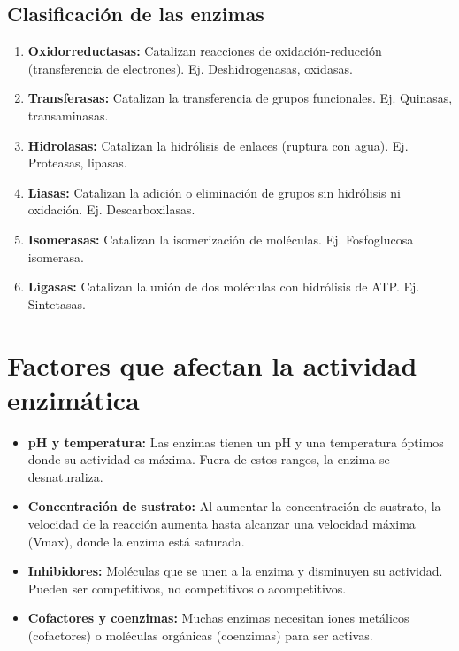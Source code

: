 \subsection{Clasificación de las enzimas}
\begin{enumerate}
    \item \textbf{Oxidorreductasas:} Catalizan reacciones de oxidación-reducción (transferencia de electrones). Ej. Deshidrogenasas, oxidasas.
    \item \textbf{Transferasas:} Catalizan la transferencia de grupos funcionales. Ej. Quinasas, transaminasas.
    \item \textbf{Hidrolasas:} Catalizan la hidrólisis de enlaces (ruptura con agua). Ej. Proteasas, lipasas.
    \item \textbf{Liasas:} Catalizan la adición o eliminación de grupos sin hidrólisis ni oxidación. Ej. Descarboxilasas.
    \item \textbf{Isomerasas:} Catalizan la isomerización de moléculas. Ej. Fosfoglucosa isomerasa.
    \item \textbf{Ligasas:} Catalizan la unión de dos moléculas con hidrólisis de ATP. Ej. Sintetasas.
\end{enumerate}

\section{Factores que afectan la actividad enzimática}

\begin{itemize}
    \item \textbf{pH y temperatura:} Las enzimas tienen un pH y una temperatura óptimos donde su actividad es máxima. Fuera de estos rangos, la enzima se desnaturaliza.
    \item \textbf{Concentración de sustrato:} Al aumentar la concentración de sustrato, la velocidad de la reacción aumenta hasta alcanzar una velocidad máxima (Vmax), donde la enzima está saturada.
    \item \textbf{Inhibidores:} Moléculas que se unen a la enzima y disminuyen su actividad. Pueden ser competitivos, no competitivos o acompetitivos.
    \item \textbf{Cofactores y coenzimas:} Muchas enzimas necesitan iones metálicos (cofactores) o moléculas orgánicas (coenzimas) para ser activas.
\end{itemize}

